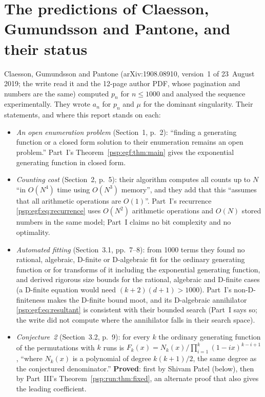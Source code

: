 \documentclass[11pt,letterpaper]{article}
\numberwithin{equation}{section}
\theoremstyle{remark}\newtheorem{remark}[theorem]{Remark}
\begin{document}
\section*{The predictions of Claesson, Gu\dh mundsson and Pantone, and their status}\label{psp:sec:cgp}
Claesson, Gu\dh mundsson and Pantone \cite{cgp} (arXiv:1908.08910, version~1 of 23~August 2019; the write read it and the 12-page author PDF, whose pagination and numbers are the same) computed $p_n$ for $n\le1000$ and analysed the sequence experimentally. They wrote $a_n$ for $p_n$ and $\mu$ for the dominant singularity. Their statements, and where this report stands on each:
\begin{itemize}
\item \emph{An open enumeration problem} (Section~1, p.~2): ``finding a generating function or a closed form solution to their enumeration remains an open problem.'' Part~I's Theorem~\ref{psp:egf:thm:main} gives the exponential generating function in closed form.
\item \emph{Counting cost} (Section~2, p.~5): their algorithm computes all counts up to $N$ ``in $O(N^4)$ time using $O(N^3)$ memory'', and they add that this ``assumes that all arithmetic operations are $O(1)$''. Part~I's recurrence \eqref{psp:egf:eq:recurrence} uses $O(N^2)$ arithmetic operations and $O(N)$ stored numbers in the same model; Part~I claims no bit complexity and no optimality.
\item \emph{Automated fitting} (Section~3.1, pp.~7--8): from 1000 terms they found no rational, algebraic, D-finite or D-algebraic fit for the ordinary generating function or for transforms of it including the exponential generating function, and derived rigorous size bounds for the rational, algebraic and D-finite cases (a D-finite equation would need $(k+2)(d+1)>1000$). Part~I's non-D-finiteness makes the D-finite bound moot, and its D-algebraic annihilator \eqref{psp:egf:eq:resultant} is consistent with their bounded search (Part~I says so; the write did not compute where the annihilator falls in their search space).
\item \emph{Conjecture~2} (Section~3.2, p.~9): for every $k$ the ordinary generating function of the permutations with $k$ runs is $F_k(x)=N_k(x)/\prod_{i=1}^k(1-ix)^{k-i+1}$, ``where $N_k(x)$ is a polynomial of degree $k(k+1)/2$, the same degree as the conjectured denominator.'' \textbf{Proved}: first by Shivam Patel (below), then by Part~III's Theorem~\ref{psp:run:thm:fixed}, an alternate proof that also gives the leading coefficient.

\end{itemize}
\end{document}
